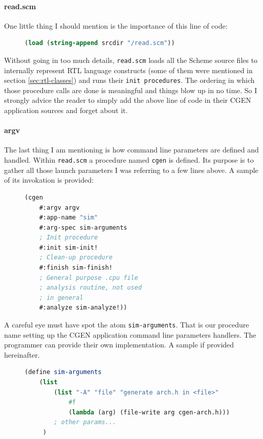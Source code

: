 \documentclass{article}
\begin{document}
\paragraph{read.scm}
One little thing I should mention is the importance of this line of code:

\begin{figure}[H]
\begin{lstlisting}[language=Scheme]
(load (string-append srcdir "/read.scm"))
\end{lstlisting}
\end{figure}

Without going in too much details, \texttt{read.scm} loads all the Scheme source files to internally represent RTL language constructs (some of them were mentioned in section \ref{sec:rtl-classes}) and runs their \texttt{init procedures}. The ordering in which those procedure calls are done is meaningful and things blow up in no time. So I strongly advice the reader to simply add the above line of code in their CGEN application sources and forget about it.

\paragraph{argv}
The last thing I am mentioning is how command line parameters are defined and handled. Within \texttt{read.scm} a procedure named \texttt{cgen} is defined. Its purpose is to gather all those launch parameters I was referring to a few lines above. A sample of its invokation is provided:
\begin{figure}[H]
\begin{lstlisting}[language=Scheme]
(cgen
	#:argv argv
	#:app-name "sim"
	#:arg-spec sim-arguments
	; Init procedure
	#:init sim-init!
	; Clean-up procedure
	#:finish sim-finish!
	; General purpose .cpu file
	; analysis routine, not used
	; in general
	#:analyze sim-analyze!))
\end{lstlisting}
\end{figure}

A careful eye must have spot the atom \texttt{sim-arguments}. That is our procedure name setting up the CGEN application command line parameters handlers. The programmer can provide their own implementation. A sample if provided hereinafter.

\begin{figure}[H]
\begin{lstlisting}[language=Scheme]
(define sim-arguments
	(list
		(list "-A" "file" "generate arch.h in <file>"
			#f
	 		(lambda (arg) (file-write arg cgen-arch.h)))
	 	; other params...
	 )
\end{lstlisting}
\end{figure}
\end{document}
